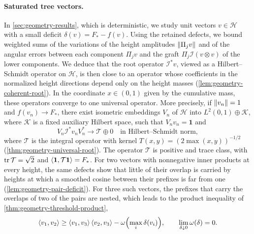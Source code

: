 \paragraph{Saturated tree vectors.}
In \cref{sec:geometry-results}, which is deterministic, we study unit vectors $v\in\mathcal H$ with a small deficit $\delta(v)=F_*-f(v)$. Using the retained defects, we bound weighted sums of the variations of the height amplitudes $\lVert\Pi_jv\rVert$ and of the angular errors between each component $\Pi_jv$ and the graft $\Pi_j\mathcal I(v\otimes v)$ of the lower components. We deduce that the root operator $\mathcal I^*v$, viewed as a Hilbert--Schmidt operator on $\mathcal H$, is then close to an operator whose coefficients in the normalized height directions depend only on the height masses (\cref{lem:geometry-coherent-root}). In the coordinate $x\in(0,1)$ given by the cumulative mass, these operators converge to one universal operator. More precisely, if $\lVert v_n\rVert=1$ and $f(v_n)\to F_*$, there exist isometric embeddings $V_n$ of $\mathcal H$ into $L^2(0,1)\oplus\mathcal K$, where $\mathcal K$ is a fixed auxiliary Hilbert space, such that $V_nv_n=\mathbf1$ and
\[
 V_n\mathcal I^*v_nV_n^*\longrightarrow\mathcal T\oplus0\quad\text{in Hilbert--Schmidt norm},
\]
where $\mathcal T$ is the integral operator with kernel $T(x,y)=(2\max(x,y))^{-1/2}$ (\cref{thm:geometry-universal-root}). The operator $\mathcal T$ is positive and trace class, with $\operatorname{tr}\mathcal T=\sqrt2$ and $\left\langle\mathbf1,\mathcal T\mathbf1\right\rangle=F_*$. For two vectors with nonnegative inner products at every height, the same defects show that little of their overlap is carried by heights at which a smoothed cosine between their prefixes is far from one (\cref{lem:geometry-pair-deficit}). For three such vectors, the prefixes that carry the overlaps of two of the pairs are nested, which leads to the product inequality of \cref{thm:geometry-threshold-product},
\[
 \left\langle v_1,v_2\right\rangle\ge\left\langle v_1,v_3\right\rangle\left\langle v_2,v_3\right\rangle-\omega\Bigl(\max_i\delta(v_i)\Bigr),\qquad
 \lim_{\delta\downarrow0}\omega(\delta)=0 .
\]

